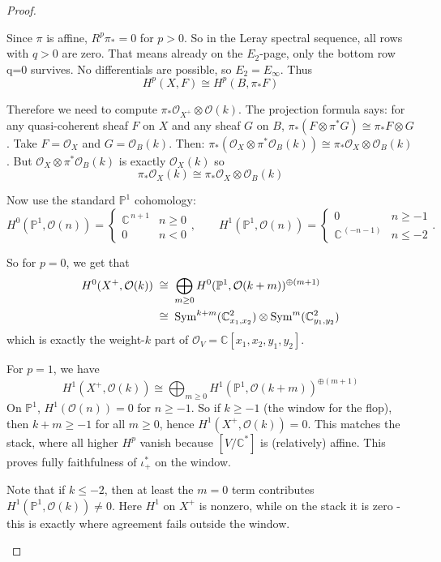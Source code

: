 \documentclass[12pt]{article}
\begin{document}
\begin{proof}
\begin{remark}
  Since $\pi$ is affine, $R^p\pi_*=0$ for $p>0$.
  So in the Leray spectral sequence, all rows with $q>0$ are zero. That means already on the $E_2$-page, only the bottom row q=0 survives. No differentials are possible, so $E_2=E_\infty$.
Thus
  \[H^p(X,F) \cong H^p(B,\pi_*F)\]

  Therefore we need to compute $\pi_*\mathcal{O}_{X^+} \otimes \mathcal{O}(k)$. The projection formula says: for any quasi-coherent sheaf $F$ on $X$ and any sheaf $G$ on $B$, $\pi_*(F\otimes \pi^*G) \cong \pi_*F \otimes G$. Take $F=\mathcal{O}_X$ and $G=\mathcal{O}_B(k)$. Then: $\pi_*(\mathcal{O}_X\otimes \pi^*\mathcal{O}_B(k)) \cong \pi_*\mathcal{O}_X \otimes \mathcal{O}_B(k)$. But $\mathcal{O}_X\otimes \pi^*\mathcal{O}_B(k)$ is exactly $\mathcal{O}_X(k)$ so \[\pi_*\mathcal{O}_X(k) \cong \pi_*\mathcal{O}_X \otimes \mathcal{O}_B(k)\]
\end{remark}

Now use the standard $\mathbb{P}^1$ cohomology:
\[
  H^0(\mathbb{P}^1,\mathcal{O}(n))=\begin{cases}\mathbb{C}^{\,n+1}& n\ge0\\ 0& n<0\end{cases},\qquad
  H^1(\mathbb{P}^1,\mathcal{O}(n))=\begin{cases}0& n\ge-1\\ \mathbb{C}^{\,(-n-1)}& n\le-2\end{cases}.
\]

So for $p=0$, we get that \begin{align*}
  H^0(X^+,\mathcal O(k)) &\;\cong\;
\bigoplus_{m\ge0} H^0(\mathbb P^1,\mathcal O(k+m))^{\oplus(m+1)} \\
&\;\cong\; \operatorname{Sym}^{k+m}(\mathbb C^2_{x_1,x_2}) \otimes \operatorname{Sym}^m(\mathbb C^2_{y_1,y_2}) \\
\end{align*} which is exactly the weight-$k$ part of $\mathcal O_V=\mathbb C[x_1,x_2,y_1,y_2]$.

For $p=1$, we have \[H^1(X^+,\mathcal O(k))\cong \bigoplus_{m\ge0} H^1(\mathbb P^1,\mathcal O(k+m))^{\oplus(m+1)}\]
 On $\mathbb P^1$, $H^1(\mathcal O(n))=0$ for $n\ge -1$. So if $k\ge -1$ (the window for the flop), then $k+m\ge -1$ for all $m\ge0$, hence $H^1(X^+,\mathcal O(k))=0$. This matches the stack, where all higher $H^p$ vanish because $[V/\mathbb C^*]$ is (relatively) affine. This proves fully faithfulness of $\iota_+^*$ on the window.
\begin{remark}
Note that if $k\leq -2$, then at least the $m=0$ term contributes $H^1(\mathbb{P}^1,\mathcal{O}(k))\neq 0$. Here $H^1$ on $X^+$ is nonzero, while on the stack it is zero - this is exactly where agreement fails outside the window.
\end{remark}



\end{proof}
\end{document}
